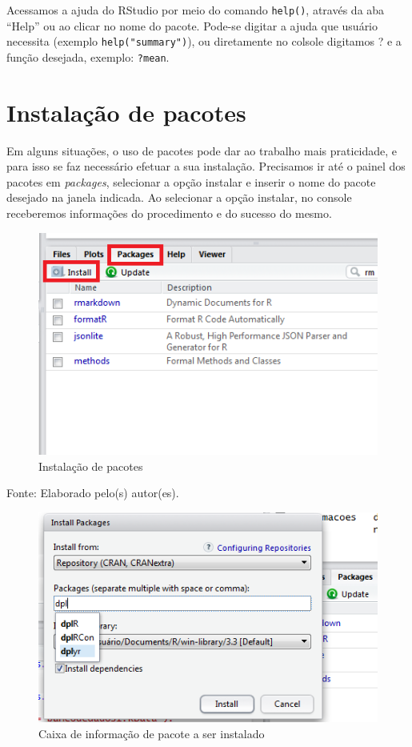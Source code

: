 \documentclass[12pt,brazil,oneside]{book}
\begin{document}
Acessamos a ajuda do RStudio por meio do comando \texttt{help()}, através da aba ``Help'' ou ao clicar no nome do pacote. Pode-se digitar a ajuda que usuário necessita (exemplo \texttt{help("summary")}), ou diretamente no colsole digitamos ? e a função desejada, exemplo: \texttt{?mean}.

\hypertarget{instalacao-de-pacotes}{%
\section{Instalação de pacotes}\label{instalacao-de-pacotes}}

Em alguns situações, o uso de pacotes pode dar ao trabalho mais praticidade, e para isso se faz necessário efetuar a sua instalação. Precisamos ir até o painel dos pacotes em \emph{packages}, selecionar a opção instalar e inserir o nome do pacote desejado na janela indicada. Ao selecionar a opção instalar, no console receberemos informações do procedimento e do sucesso do mesmo.

\begin{figure}[H]

{\centering \includegraphics[width=0.7\linewidth]{pacotes1} 

}

\caption{Instalação de pacotes}\label{fig:pacotes1}
\end{figure}

Fonte: Elaborado pelo(s) autor(es).

\begin{figure}[H]

{\centering \includegraphics[width=0.7\linewidth]{pacotes2} 

}

\caption{Caixa de informação de pacote a ser instalado}\label{fig:pacotes2}
\end{figure}
\end{document}
